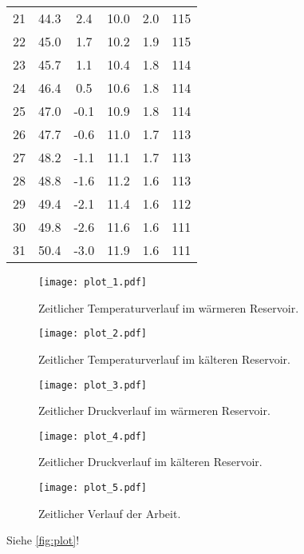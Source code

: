\begin{table}[H]
\begin{tabular}{S[table-format=2.0] S S S S S[table-format=3.0]}
    21 & 44.3 &  2.4 & 10.0 & 2.0 & 115 \\
    22 & 45.0 &  1.7 & 10.2 & 1.9 & 115 \\
    23 & 45.7 &  1.1 & 10.4 & 1.8 & 114 \\
    24 & 46.4 &  0.5 & 10.6 & 1.8 & 114 \\
    25 & 47.0 & {-0.1} & 10.9 & 1.8 & 114 \\
    26 & 47.7 & {-0.6} & 11.0 & 1.7 & 113 \\
    27 & 48.2 & {-1.1} & 11.1 & 1.7 & 113 \\
    28 & 48.8 & {-1.6} & 11.2 & 1.6 & 113 \\
    29 & 49.4 & {-2.1} & 11.4 & 1.6 & 112 \\
    30 & 49.8 & {-2.6} & 11.6 & 1.6 & 111 \\
    31 & 50.4 & {-3.0} & 11.9 & 1.6 & 111 \\
    \bottomrule
  \end{tabular}
\end{table}



\begin{figure}
  \centering
  \texttt{[image: plot\_1.pdf]}
  \caption{Zeitlicher Temperaturverlauf im wärmeren Reservoir.}
  \label{fig:plot1}
\end{figure}


\begin{figure}
  \centering
  \texttt{[image: plot\_2.pdf]}
  \caption{Zeitlicher Temperaturverlauf im kälteren Reservoir.}
  \label{fig:plot2}
\end{figure}


\begin{figure}
  \centering
  \texttt{[image: plot\_3.pdf]}
  \caption{Zeitlicher Druckverlauf im wärmeren Reservoir.}
  \label{fig:plot3}
\end{figure}


\begin{figure}
  \centering
  \texttt{[image: plot\_4.pdf]}
  \caption{Zeitlicher Druckverlauf im kälteren Reservoir.}
  \label{fig:plot4}
\end{figure}


\begin{figure}
  \centering
  \texttt{[image: plot\_5.pdf]}
  \caption{Zeitlicher Verlauf der Arbeit.}
  \label{fig:plot5}
\end{figure}


Siehe \autoref{fig:plot}!

